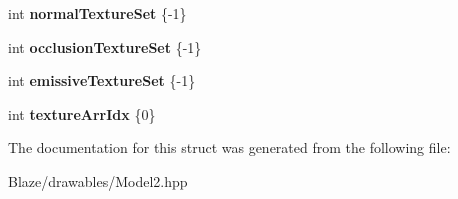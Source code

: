 \begin{DoxyCompactItemize}
int {\bfseries normal\+Texture\+Set} \{-\/1\}
\item 
\mbox{\label{structblaze_1_1Model2_1_1Material_1_1PCB_ab8efe1a0b2ecb017eb64a615d667b434}} 
int {\bfseries occlusion\+Texture\+Set} \{-\/1\}
\item 
\mbox{\label{structblaze_1_1Model2_1_1Material_1_1PCB_af074678bee79b546f03e74dc75d8d873}} 
int {\bfseries emissive\+Texture\+Set} \{-\/1\}
\item 
\mbox{\label{structblaze_1_1Model2_1_1Material_1_1PCB_a19d91fe0c1a9bf12642b134a2d21b7cf}} 
int {\bfseries texture\+Arr\+Idx} \{0\}
\end{DoxyCompactItemize}


The documentation for this struct was generated from the following file\+:\begin{DoxyCompactItemize}
\item 
Blaze/drawables/Model2.\+hpp\end{DoxyCompactItemize}
